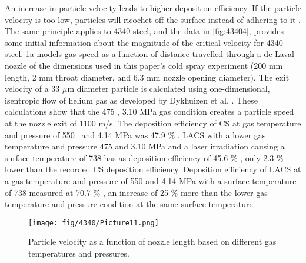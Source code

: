 An increase in particle velocity leads to higher deposition efficiency. If the particle velocity is too low, particles will ricochet off the surface instead of adhering to it \cite{RN1246}. The same principle applies to 4340 steel, and the data in \ref{fig:43404}, provides some initial information about the magnitude of the critical velocity for 4340 steel. \ref{fig:434011}a models gas speed as a function of distance travelled through a de Laval nozzle of the dimensions used in this paper’s cold spray experiment (200 mm length, 2 mm throat diameter, and 6.3 mm nozzle opening diameter). The exit velocity of a 33 $ \mu $m diameter particle is calculated using one-dimensional, isentropic flow of helium gas as developed by Dykhuizen et al. \cite{RN1248}. These calculations show that the 475 \celsius{}, 3.10 MPa gas condition creates a particle speed at the nozzle exit of 1100 m/s. The deposition efficiency of CS at gas temperature and pressure of 550 \celsius{} and 4.14 MPa was 47.9 $\%$ . LACS with a lower gas temperature and pressure 475 \celsius{} and 3.10 MPa\textbf{ }and a laser irradiation causing a surface temperature of 738 \celsius{} has as deposition efficiency of 45.6 $\%$ , only 2.3 $\%$  lower than the recorded CS deposition efficiency. Deposition efficiency of LACS at a gas temperature and pressure of 550 \celsius{} and 4.14 MPa with a surface temperature of 738 \celsius{} measured at 70.7 $\%$ , an increase of 25 $\%$  more than the lower gas temperature and pressure condition at the same surface temperature.


\begin{figure}
	\centering
	\texttt{[image: fig/4340/Picture11.png]}
	\caption{Particle velocity as a function of nozzle length based on different gas temperatures and pressures.}
	\label{fig:434011}
\end{figure}



